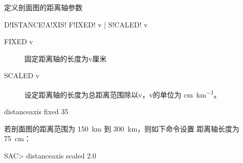\label{sss:distanceaxis}

定义剖面图的距离轴参数

\begin{SACSTX}
D!ISTANCE!A!XIS! F!IXED! v | S!CALED! v
\end{SACSTX}

\begin{description}
\item [FIXED v] 固定距离轴的长度为v厘米
\item [SCALED v] 设定距离轴的长度为总距离范围除以v，v的单位为 \si{\cm\per\km}。
\end{description}

\begin{SACDFT}
distanceaxis fixed 35
\end{SACDFT}

若剖面图的距离范围为 \SI{150}{\km} 到 \SI{300}{\km}，则如下命令设置
距离轴长度为 \SI{75}{\cm}：
\begin{SACCode}
SAC> distanceaxis scaled 2.0
\end{SACCode}
